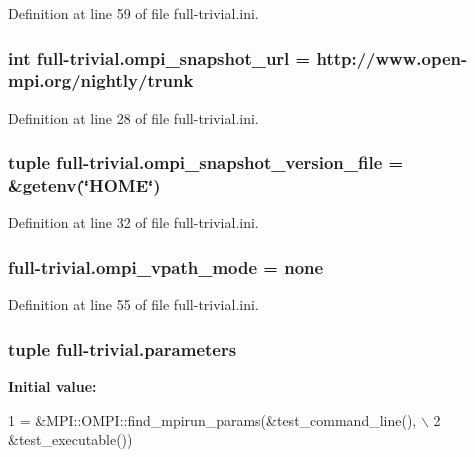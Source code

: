 Definition at line 59 of file full-\/trivial.\-ini.

\hypertarget{namespacefull-trivial_ad99b4206b0691dff98229634af7de89e}{
\subsubsection[{ompi\-\_\-snapshot\-\_\-url}]{\setlength{\rightskip}{0pt plus 5cm}int full-\/trivial.\-ompi\-\_\-snapshot\-\_\-url = http\-://www.\-open-\/mpi.\-org/nightly/trunk}}\label{namespacefull-trivial_ad99b4206b0691dff98229634af7de89e}


Definition at line 28 of file full-\/trivial.\-ini.

\hypertarget{namespacefull-trivial_a8cb0b5677b37b7bb5ee95a14399ff9a3}{
\subsubsection[{ompi\-\_\-snapshot\-\_\-version\-\_\-file}]{\setlength{\rightskip}{0pt plus 5cm}tuple full-\/trivial.\-ompi\-\_\-snapshot\-\_\-version\-\_\-file = \&getenv(\char`\"{}H\-O\-M\-E\char`\"{})}}\label{namespacefull-trivial_a8cb0b5677b37b7bb5ee95a14399ff9a3}


Definition at line 32 of file full-\/trivial.\-ini.

\hypertarget{namespacefull-trivial_a58c9dd08bbe532a5face257efa5cbd3e}{
\subsubsection[{ompi\-\_\-vpath\-\_\-mode}]{\setlength{\rightskip}{0pt plus 5cm}full-\/trivial.\-ompi\-\_\-vpath\-\_\-mode = none}}\label{namespacefull-trivial_a58c9dd08bbe532a5face257efa5cbd3e}


Definition at line 55 of file full-\/trivial.\-ini.

\hypertarget{namespacefull-trivial_a6513f5e0f867d0312f10064a0adb1740}{
\subsubsection[{parameters}]{\setlength{\rightskip}{0pt plus 5cm}tuple full-\/trivial.\-parameters}}\label{namespacefull-trivial_a6513f5e0f867d0312f10064a0adb1740}
{\bfseries Initial value\-:}
\begin{DoxyCode}
1 = &MPI::OMPI::find\_mpirun\_params(&test\_command\_line(), \(\backslash\)
2                                            &test\_executable())
\end{DoxyCode}


